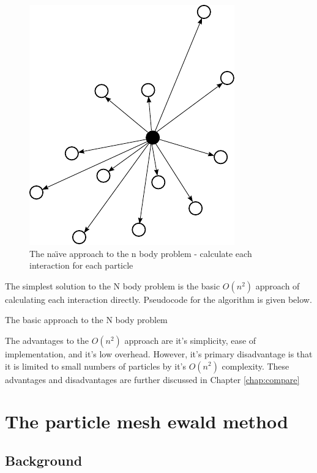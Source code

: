 \documentclass[pdftex,twoside,a4paper]{report}
\newcommand{\bcen}{\begin{center}}
\newcommand{\ecen}{\end{center}}
\begin{document}
\begin{figure}[h]
\bcen \includegraphics{figures/nbodies.pdf} \ecen
\caption{The na\"{\i}ve approach to the n body problem - calculate each interaction for each particle}
\end{figure}

The simplest solution to the N body problem is the basic $O(n^2)$ approach of calculating each interaction directly. Pseudocode for the algorithm is given below.\\

\begin{algorithm}[H]
 \SetLine
 \caption{The basic approach to the N body problem}
\end{algorithm}

The advantages to the $O(n^2)$ approach are it's simplicity, ease of implementation, and it's low overhead. However, it's primary disadvantage is that it is limited to small numbers of particles by it's $O(n^2)$ complexity. These advantages and disadvantages are further discussed in Chapter \ref{chap:compare}


\section{The particle mesh ewald method}
\subsection{Background}
\end{document}
